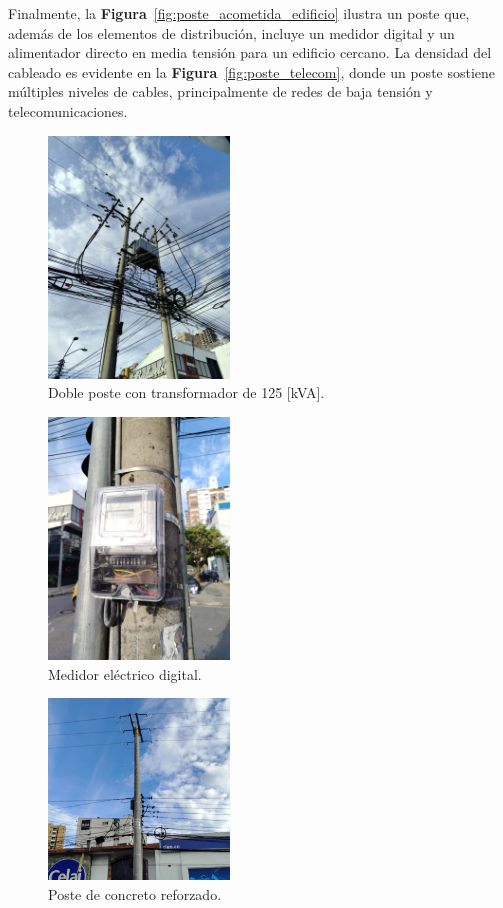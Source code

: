 Finalmente, la \textbf{Figura}~\ref{fig:poste_acometida_edificio} ilustra un poste que, además de los elementos de distribución, incluye un medidor digital y un alimentador directo en media tensión para un edificio cercano. La densidad del cableado es evidente en la \textbf{Figura}~\ref{fig:poste_telecom}, donde un poste sostiene múltiples niveles de cables, principalmente de redes de baja tensión y telecomunicaciones.

\begin{figure}[H]
    \centering
    \includegraphics[width=0.43\textwidth, height=0.43\textwidth]{fig_/1.jpeg}
    \caption{Doble poste con transformador de 125 [kVA].}
    \label{fig:doble_poste}
\end{figure}

\begin{figure}[H]
    \centering
    \includegraphics[width=0.43\textwidth, height=0.43\textwidth]{fig_/2}
    \caption{Medidor eléctrico digital.}
    \label{fig:medidor}
\end{figure}

\begin{figure}[H]
    \centering
    \includegraphics[width=0.43\textwidth, height=0.43\textwidth]{fig_/3}
    \caption{Poste de concreto reforzado.}
    \label{fig:poste_concreto}
\end{figure}

